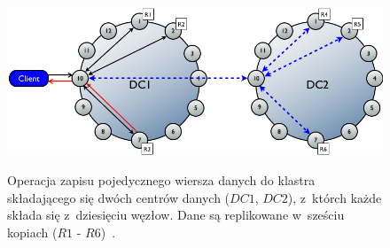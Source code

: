 \begin{figure}[!ht]
 \begin{center}
  \scalebox{0.4}
  {
   \includegraphics{figures/generated_app_type/cassandra_architecture.png}
  }
 \end{center}
 \caption{Operacja zapisu pojedycznego wiersza danych do klastra składającego się dwóch centrów danych ($DC1$, $DC2$), z~którch każde składa się z~dziesięciu węzłow.
 Dane są replikowane w~sześciu kopiach ($R1$ - $R6$)~\cite{cassandra_architecture}.}
 \label{fig:cassandra_architecture}
\end{figure}
